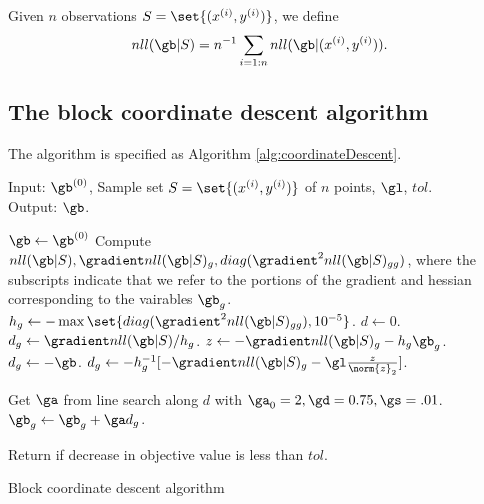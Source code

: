 \documentclass{article}
\begin{document}
Given $n$ observations $S = \set{(x^{(i)}, y^{(i)})}$, we define $$nll(\gb|S) = n^{-1}\sum_{i = 1:n}nll(\gb|(x^{(i)}, y^{(i)})).$$

\subsection{The block coordinate descent algorithm}
The algorithm is specified as Algorithm \ref{alg:coordinateDescent}.

\begin{algorithm}[ht]
Input: $\gb^{(0)}$, Sample set $S = \set{(x^{(i)}, y^{(i)})}$ of $n$ points, $\gl$, $tol$.\\
Output: $\gb$.\\
\begin{algorithmic}
\STATE $\gb \gets \gb^{(0)}$
\LOOP
{}
\STATE Compute $nll(\gb|S), \gradient nll(\gb|S)_g, diag(\gradient^{2} nll(\gb|S)_{gg})$, where the subscripts indicate that we refer to the portions of the gradient and hessian corresponding to the vairables $\gb_g$.
\STATE $h_g \gets -\max \set{diag(\gradient^{2} nll(\gb|S)_{gg}), 10^{-5}}$.
\STATE $d \gets 0$.
  \STATE $d_g \gets \gradient nll(\gb|S)/h_g$.
\ELSE
  \STATE $z \gets -\gradient nll(\gb|S)_g - h_g \gb_g$.
    \STATE $d_g \gets - \gb$.
  \ELSE
    \STATE $d_g \gets - h_g^{-1}[-\gradient nll(\gb|S)_g - \gl \frac{z}{\norm{z}_2}]$.
  \ENDIF
  
\ENDIF
{}
  \STATE Get $\ga$ from line search along $d$ with $\ga_0 = 2, \gd = 0.75, \gs = .01$.
  \STATE $\gb_{g} \gets \gb_g + \ga d_g$.
\ENDIF

\ENDFOR
\STATE Return if decrease in objective value is less than $tol$.
\ENDLOOP
\end{algorithmic}
\caption{Block coordinate descent algorithm}
\label{alg:coordinateDescent}
\end{algorithm}



\end{document}

